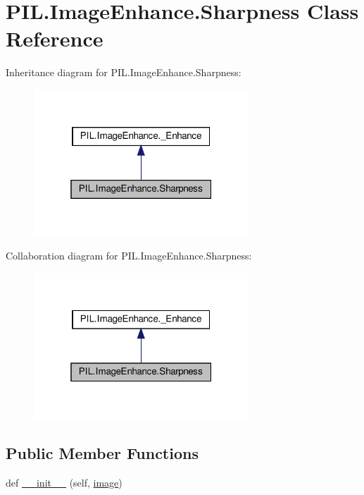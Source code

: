 \hypertarget{classPIL_1_1ImageEnhance_1_1Sharpness}{}\section{P\+I\+L.\+Image\+Enhance.\+Sharpness Class Reference}
\label{classPIL_1_1ImageEnhance_1_1Sharpness}


Inheritance diagram for P\+I\+L.\+Image\+Enhance.\+Sharpness\+:
\nopagebreak
\begin{figure}[H]
\begin{center}
\leavevmode
\includegraphics[width=229pt]{classPIL_1_1ImageEnhance_1_1Sharpness__inherit__graph}
\end{center}
\end{figure}


Collaboration diagram for P\+I\+L.\+Image\+Enhance.\+Sharpness\+:
\nopagebreak
\begin{figure}[H]
\begin{center}
\leavevmode
\includegraphics[width=229pt]{classPIL_1_1ImageEnhance_1_1Sharpness__coll__graph}
\end{center}
\end{figure}
\subsection*{Public Member Functions}
\begin{DoxyCompactItemize}
\item 
def \hyperlink{classPIL_1_1ImageEnhance_1_1Sharpness_a6398e3a4bb67d448971d10dfbf8ad01b}{\+\_\+\+\_\+init\+\_\+\+\_\+} (self, \hyperlink{classPIL_1_1ImageEnhance_1_1Sharpness_a965383939457465ea5f4b181647fa366}{image})
\end{DoxyCompactItemize}
